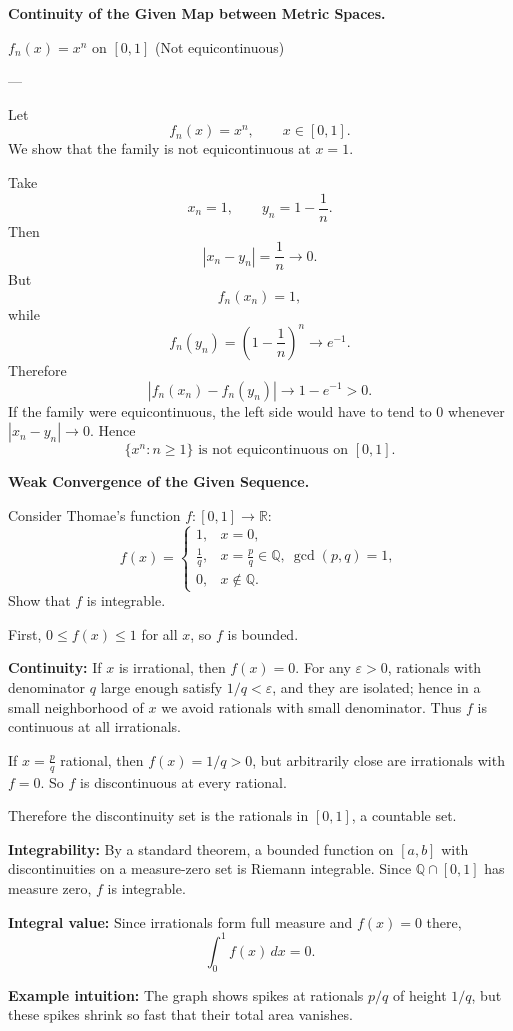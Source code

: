 \begin{problem}[CP-II-0255]
\label{prob:cp-ii-0255}
\textbf{Continuity of the Given Map between Metric Spaces.}

\hspace*{1.5em}$f_n(x)=x^n$ on $[0,1]$ (Not equicontinuous)

---
\end{problem}

\begin{solution}
Let
\[
f_n(x)=x^n,
\qquad
x\in[0,1].
\]
We show that the family is not equicontinuous at \(x=1\).

Take
\[
x_n=1,
\qquad
y_n=1-\frac1n.
\]
Then
\[
|x_n-y_n|=\frac1n\to0.
\]
But
\[
f_n(x_n)=1,
\]
while
\[
f_n(y_n)
=
\left(1-\frac1n\right)^n
\longrightarrow e^{-1}.
\]
Therefore
\[
|f_n(x_n)-f_n(y_n)|
\longrightarrow
1-e^{-1}>0.
\]
If the family were equicontinuous, the left side would have to tend to \(0\) whenever
\(|x_n-y_n|\to0\). Hence
\[
\boxed{
\{x^n:n\ge1\}
\text{ is not equicontinuous on }[0,1].
}
\]
\end{solution}


\begin{problem}[CP-II-0256]
\label{prob:cp-ii-0256}
\textbf{Weak Convergence of the Given Sequence.}

\hspace*{1.5em}Consider Thomae's function $f:[0,1]\to\mathbb{R}$:
\[
f(x)=
\begin{cases}
	1, & x=0, \\
	\frac{1}{q}, & x=\tfrac{p}{q}\in\mathbb{Q}, \ \gcd(p,q)=1, \\
	0, & x\notin\mathbb{Q}.
\end{cases}
\]
Show that $f$ is integrable.
\end{problem}

\begin{solution}
First, $0\leq f(x)\leq 1$ for all $x$, so $f$ is bounded.

	\textbf{Continuity:}
	If $x$ is irrational, then $f(x)=0$. For any $\varepsilon>0$, rationals with denominator $q$ large enough satisfy $1/q<\varepsilon$, and they are isolated; hence in a small neighborhood of $x$ we avoid rationals with small denominator. Thus $f$ is continuous at all irrationals.

	If $x=\tfrac{p}{q}$ rational, then $f(x)=1/q>0$, but arbitrarily close are irrationals with $f=0$. So $f$ is discontinuous at every rational.

	Therefore the discontinuity set is the rationals in $[0,1]$, a countable set.

	\textbf{Integrability:}
	By a standard theorem, a bounded function on $[a,b]$ with discontinuities on a measure-zero set is Riemann integrable. Since $\mathbb{Q}\cap[0,1]$ has measure zero, $f$ is integrable.

	\textbf{Integral value:} Since irrationals form full measure and $f(x)=0$ there,
	\[
	\int_0^1 f(x)\,dx = 0.
	\]

	\textbf{Example intuition:} The graph shows spikes at rationals $p/q$ of height $1/q$, but these spikes shrink so fast that their total area vanishes.
\end{solution}

